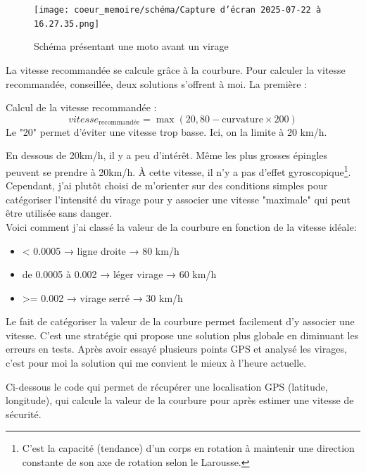 \begin{figure}[H]
    \centering
    \texttt{[image: coeur\_memoire/schéma/Capture d’écran 2025-07-22 à 16.27.35.png]} 
    \caption{Schéma présentant une moto avant un virage}
    \label{schemaviragepoint}
\end{figure}



La vitesse recommandée se calcule grâce à la courbure. Pour calculer la vitesse recommandée, conseillée, deux solutions s'offrent à moi. La première : \\
\begin{tcolorbox}[title=Vitesse recommandée]
Calcul de la vitesse recommandée :
\[
vitesse_{\text{recommandée}} = \max(20, 80-\text{curvature} \times 200)
\]
Le "20" permet d'éviter une vitesse trop basse. Ici, on la limite à 20 km/h.

\end{tcolorbox}

En dessous de 20km/h, il y a peu d'intérêt. Même les plus grosses épingles peuvent se prendre à 20km/h. À cette vitesse, il n'y a pas d'effet gyroscopique\footnote{C'est la capacité (tendance) d'un corps en rotation à maintenir une direction constante de son axe de rotation selon le Larousse.}.
Cependant, j'ai plutôt choisi de m'orienter sur des conditions simples pour catégoriser l'intensité du virage pour y associer une vitesse "maximale" qui peut être utilisée sans danger.\\
\vspace{0.5cm}
Voici comment j'ai classé la valeur de la courbure en fonction de la vitesse idéale: 
\begin{itemize}
    \item < 0.0005 → ligne droite → 80 km/h
    \item de 0.0005 à 0.002 → léger virage → 60 km/h
    \item >= 0.002 → virage serré → 30 km/h
\end{itemize}
\vspace{0.5cm}

Le fait de catégoriser la valeur de la courbure permet facilement d'y associer une vitesse. C'est une stratégie qui propose une solution plus globale en diminuant les erreurs en tests. Après avoir essayé plusieurs points GPS et analysé les virages, c'est pour moi la solution qui me convient le mieux à l'heure actuelle.
\vspace{0.5cm}


\vspace{0.5cm}
Ci-dessous le code qui permet de récupérer une localisation GPS (latitude, longitude), qui calcule la valeur de la courbure pour après estimer une vitesse de sécurité.


